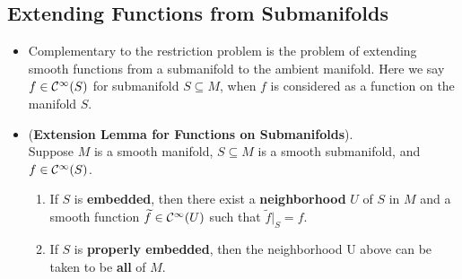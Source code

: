 \documentclass[11pt]{article}
\begin{document}
\subsection{Extending Functions from Submanifolds}
\begin{itemize}
\item \begin{remark}
Complementary to the restriction problem is the problem of extending smooth functions from a submanifold to the ambient manifold. Here we say $f \in {\mathcal C}^{\infty}(S)$ for submanifold $S\subseteq M$, when $f$ is considered as a function on the manifold $S$.
\end{remark}

\item \begin{lemma} (\textbf{Extension Lemma for Functions on Submanifolds}). \\
Suppose $M$ is a smooth manifold, $S\subseteq M$ is a smooth submanifold, and $f \in {\mathcal C}^{\infty}(S)$.
\begin{enumerate}
\item  If $S$ is \textbf{embedded}, then there exist a \textbf{neighborhood} $U$ of $S$ in $M$ and a smooth
function $\widetilde{f} \in  {\mathcal C}^{\infty}(U)$ such that $\widetilde{f}|_{S} = f$.
\item If $S$ is \textbf{properly embedded}, then the neighborhood U above can be taken to be \textbf{all} of $M$. 
\end{enumerate}
\end{lemma}
\end{itemize}
\end{document}
